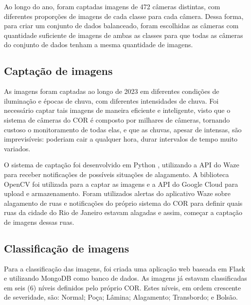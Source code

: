 Ao longo do ano, foram captadas imagens de 472 câmeras distintas, com diferentes proporções de imagens de cada classe para cada câmera. 
Dessa forma, para criar um conjunto de dados balanceado, 
foram escolhidas as câmeras com quantidade suficiente de imagens de ambas as classes para que todas as câmeras do conjunto de dados tenham a mesma quantidade de imagens.

\subsection{Captação de imagens}


As imagens foram captadas ao longo de 2023 em diferentes condições de iluminação e épocas de chuva, com diferentes intensidades de chuva. 
Foi necessário captar tais imagens de maneira eficiente e inteligente, visto que o sistema de câmeras do COR é composto por milhares de câmeras, 
tornando custoso o monitoramento de todas elas, e que as chuvas, apesar de intensas, são imprevisíveis: poderiam cair a qualquer hora, durar intervalos de tempo muito variados.

O sistema de captação foi desenvolvido em Python \cite{van1995python}, utilizando a API do Waze para receber notificações de possíveis situações de alagamento. A biblioteca OpenCV \cite{itseez2015opencv} foi utilizada para a captar as imagens e a API do Google Cloud para upload e armazenamento.
Foram utilizados alertas do aplicativo Waze sobre alagamento de ruas e notificações do próprio sistema do COR para definir quais ruas da cidade do Rio de Janeiro estavam alagadas e assim, começar a captação de imagens dessas ruas. 


\subsection{Classificação de imagens}
Para a classificação das imagens, foi criada uma aplicação web baseada em Flask e utilizando MongoDB como banco de dados. 
As imagens já estavam classificadas em seis (6) níveis definidos pelo próprio COR. Estes níveis, em ordem crescente de severidade, são: Normal; Poça; Lâmina; Alagamento; Transbordo; e Bolsão. 

